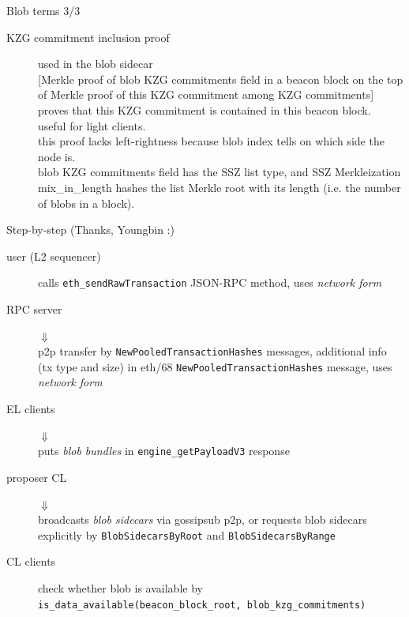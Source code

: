 \documentclass[10pt]{beamer}
\begin{document}
\begin{frame}[fragile]{Blob terms 3/3}
\begin{description}
  \item[KZG commitment inclusion proof] used in the blob sidecar \\
    {[Merkle proof of blob KZG commitments field in a beacon block
    on the top of Merkle proof of this KZG commitment among KZG commitments]} \\
    proves that this KZG commitment is contained in this beacon block. \\
    useful for light clients. \\
    this proof lacks left-rightness because blob index tells on which side
    the node is. \\
    blob KZG commitments field has the SSZ list type, and SSZ
    Merkleization mix\_in\_length hashes the list Merkle root with its length
    (i.e. the number of blobs in a block).
\end{description}
\end{frame}

\begin{frame}[fragile]{Step-by-step (Thanks, Youngbin :)}
\begin{description}
  \item[user (L2 sequencer)] calls \texttt{eth\_sendRawTransaction}
    JSON-RPC method, uses \emph{network form}
  \item[RPC server] $\Downarrow$ \\
    p2p transfer by \texttt{NewPooledTransactionHashes}
    messages, additional info (tx type and size) in
    eth/68 \texttt{NewPooledTransactionHashes} message,
    uses \emph{network form}
  \item[EL clients] $\Downarrow$ \\
    puts \emph{blob bundles} in
    \texttt{engine\_getPayloadV3} response
  \item[proposer CL] $\Downarrow$ \\
    broadcasts \emph{blob sidecars} via
    gossipsub p2p, or requests blob sidecars explicitly by
    \texttt{BlobSidecarsByRoot} and \texttt{BlobSidecarsByRange}
  \item[CL clients] check whether blob is available by
    \texttt{is\_data\_available(beacon\_block\_root, blob\_kzg\_commitments)}
\end{description}
\end{frame}
\end{document}
